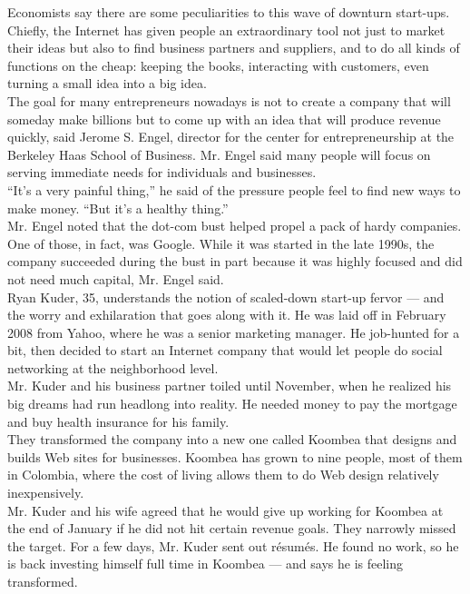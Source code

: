 \documentclass[spanish]{article}
\begin{document}
Economists say there are some peculiarities to this wave of downturn start-ups. Chiefly,
the Internet has given people an extraordinary tool not just to market their ideas but also to find
business partners and suppliers, and to do all kinds of functions on the cheap: keeping the books,
interacting with customers, even turning a small idea into a big idea.\\

The goal for many entrepreneurs nowadays is not to create a company that will someday make billions
but to come up with an idea that will produce revenue quickly, said Jerome S. Engel, director for the
center for entrepreneurship at the Berkeley Haas School of Business.
Mr. Engel said many people will focus on serving immediate needs for individuals and businesses.\\

“It’s a very painful thing,” he said of the pressure people feel to find new ways to make money.
“But it’s a healthy thing.”\\

Mr. Engel noted that the dot-com bust helped propel a pack of hardy companies. One of those, in fact, was Google. While it was started in the late 1990s, the company succeeded during the bust in part because it was highly focused and did not need much capital, Mr. Engel said.\\

Ryan Kuder, 35, understands the notion of scaled-down start-up fervor — and the worry and exhilaration that goes along with it. He was laid off in February 2008 from Yahoo, where he was a senior marketing manager. He job-hunted for a bit, then decided to start an Internet company that would let people do social networking at the neighborhood level.\\

Mr. Kuder and his business partner toiled until November, when he realized his big dreams had run headlong into reality. He needed money to pay the mortgage and buy health insurance for his family.\\

They transformed the company into a new one called Koombea that designs and builds Web sites for businesses. Koombea has grown to nine people, most of them in Colombia, where the cost of living allows them to do Web design relatively inexpensively.\\

Mr. Kuder and his wife agreed that he would give up working for Koombea at the end of January if he did not hit certain revenue goals. They narrowly missed the target. For a few days, Mr. Kuder sent out résumés. He found no work, so he is back investing himself full time in Koombea — and says he is feeling transformed.\\
\end{document}
